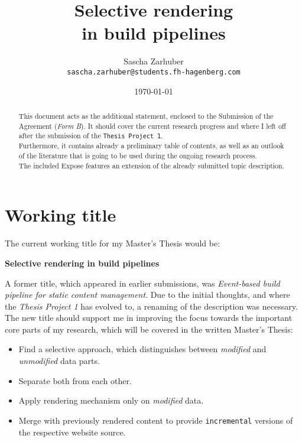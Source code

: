 \documentclass[a4paper,english,11pt]{article}
\author{
Sascha Zarhuber\\ 
\texttt{sascha.zarhuber@students.fh-hagenberg.com}
}
\title{Selective rendering\\
in build pipelines}
\date{\today}
\begin{document}
\maketitle

\begin{abstract}
This document acts as the additional statement, enclosed to the Submission of the Agreement (\emph{Form B}). It should cover the current research progress and where I left off after the submission of the \texttt{Thesis Project 1}.\\
Furthermore, it contains already a preliminary table of contents, as well as an outlook of the literature that is going to be used during the ongoing research process.\\
The included Expose features an extension of the already submitted topic description.
\end{abstract}


\section{Working title}
The current working title for my Master's Thesis would be:

\begin{center}
\textbf{Selective rendering in build pipelines}
\end{center}

A former title, which appeared in earlier submissions, was \emph{Event-based build pipeline for static content management}. Due to the initial thoughts, and where the \emph{Thesis Project 1} has evolved to, a renaming of the description was necessary.\\
The new title should support me in improving the focus towards the important core parts of my research, which will be covered in the written Master's Thesis:
\begin{itemize}
	\item Find a selective approach, which distinguishes between \emph{modified} and \emph{unmodified} data parts.
	\item Separate both from each other.
	\item Apply rendering mechanism only on \emph{modified} data.
	\item Merge with previously rendered content to provide \texttt{incremental} versions of the respective website source.
\end{itemize}
\end{document}
